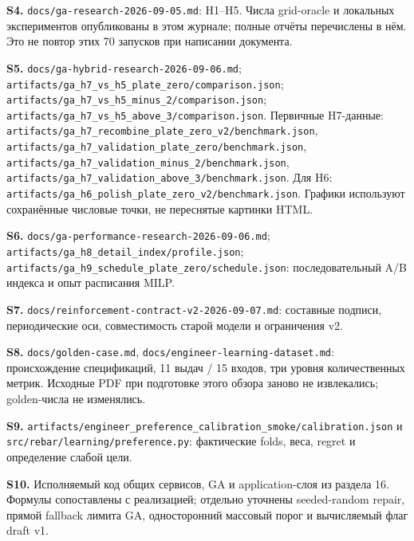 \documentclass[11pt,a4paper]{article}
\begin{document}
\hypertarget{S4}{}

\textbf{S4.} {\small\nolinkurl{docs/ga-research-2026-09-05.md}}: H1–H5. Числа grid-oracle и локальных экспериментов опубликованы в этом журнале; полные отчёты перечислены в нём. Это не повтор этих 70 запусков при написании документа.


\hypertarget{S5}{}

\textbf{S5.} {\small\nolinkurl{docs/ga-hybrid-research-2026-09-06.md}}; {\small\nolinkurl{artifacts/ga_h7_vs_h5_plate_zero/comparison.json}}; {\small\nolinkurl{artifacts/ga_h7_vs_h5_minus_2/comparison.json}}; {\small\nolinkurl{artifacts/ga_h7_vs_h5_above_3/comparison.json}}. Первичные H7-данные: {\small\nolinkurl{artifacts/ga_h7_recombine_plate_zero_v2/benchmark.json}}, {\small\nolinkurl{artifacts/ga_h7_validation_plate_zero/benchmark.json}}, {\small\nolinkurl{artifacts/ga_h7_validation_minus_2/benchmark.json}}, {\small\nolinkurl{artifacts/ga_h7_validation_above_3/benchmark.json}}. Для H6: {\small\nolinkurl{artifacts/ga_h6_polish_plate_zero_v2/benchmark.json}}. Графики используют сохранённые числовые точки, не переснятые картинки HTML.


\hypertarget{S6}{}

\textbf{S6.} {\small\nolinkurl{docs/ga-performance-research-2026-09-06.md}}; {\small\nolinkurl{artifacts/ga_h8_detail_index/profile.json}}; {\small\nolinkurl{artifacts/ga_h9_schedule_plate_zero/schedule.json}}: последовательный A/B индекса и опыт расписания MILP.


\hypertarget{S7}{}

\textbf{S7.} {\small\nolinkurl{docs/reinforcement-contract-v2-2026-09-07.md}}: составные подписи, периодические оси, совместимость старой модели и ограничения v2.


\hypertarget{S8}{}

\textbf{S8.} {\small\nolinkurl{docs/golden-case.md}}, {\small\nolinkurl{docs/engineer-learning-dataset.md}}: происхождение спецификаций, 11 выдач / 15 входов, три уровня количественных метрик. Исходные PDF при подготовке этого обзора заново не извлекались; golden-числа не изменялись.


\hypertarget{S9}{}

\textbf{S9.} {\small\nolinkurl{artifacts/engineer_preference_calibration_smoke/calibration.json}} и {\small\nolinkurl{src/rebar/learning/preference.py}}: фактические folds, веса, regret и определение слабой цели.


\hypertarget{S10}{}

\textbf{S10.} Исполняемый код общих сервисов, GA и application-слоя из раздела 16. Формулы сопоставлены с реализацией; отдельно уточнены seeded-random repair, прямой fallback лимита GA, односторонний массовый порог и вычисляемый флаг draft v1.
\end{document}
